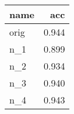 \begin{tabular}{lr}
\toprule
   name &      acc \\
\midrule
   orig & 0.944 \\
    n\_1 & 0.899 \\
    n\_2 & 0.934 \\
    n\_3 & 0.940 \\
    n\_4 & 0.943 \\
\bottomrule
\end{tabular}